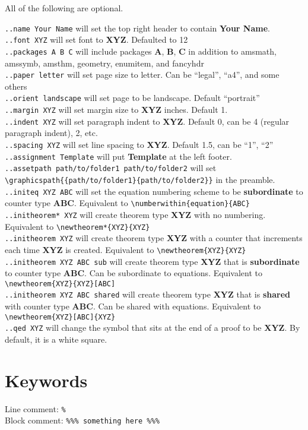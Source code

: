 \documentclass[12pt]{article}
\newcommand{\nl}{\\}
\renewcommand\bold{\textbf}
\numberwithin{equation}{section}
\begin{document}
\begin{flushleft}
\bigskip
\bigskip

All of the following are optional.

\verb|..name Your Name| will set the top right header to contain \bold{Your Name}. \nl
\verb|..font XYZ| will set font to \bold{XYZ}. Defaulted to 12 \nl
\verb|..packages A B C| will include packages \bold{A}, \bold{B}, \bold{C} in addition to amsmath, amssymb, amsthm, geometry, enumitem, and fancyhdr \nl
\verb|..paper letter| will set page size to letter. Can be ``legal'', ``a4'', and some others\nl
\verb|..orient landscape| will set page to be landscape. Default ``portrait''\nl
\bigskip
\verb|..margin XYZ| will set margin size to \bold{XYZ} inches. Default 1.\nl
\verb|..indent XYZ| will set paragraph indent to \bold{XYZ}. Default 0, can be 4 (regular paragraph indent), 2, etc. \nl
\verb|..spacing XYZ| will set line spacing to \bold{XYZ}. Default 1.5, can be ``1'', ``2''\nl
\verb|..assignment Template| will put \bold{Template} at the left footer. \nl
\verb|..assetpath path/to/folder1 path/to/folder2| will set \verb|\graphicspath{{path/to/folder1}{path/to/folder2}}| in the preamble. \nl
\bigskip
\verb|..initeq XYZ ABC| will set the equation numbering scheme to be \bold{subordinate} to counter type \bold{ABC}. Equivalent to \verb|\numberwithin{equation}{ABC}|\nl
\verb|..initheorem* XYZ| will create theorem type \bold{XYZ} with no numbering. Equivalent to \verb|\newtheorem*{XYZ}{XYZ}|\nl
\verb|..initheorem XYZ| will create theorem type \bold{XYZ} with a counter that increments each time \bold{XYZ} is created. Equivalent to \verb|\newtheorem{XYZ}{XYZ}|\nl
\verb|..initheorem XYZ ABC sub| will create theorem type \bold{XYZ} that is \bold{subordinate} to counter type \bold{ABC}. Can be subordinate to equations. Equivalent to \verb|\newtheorem{XYZ}{XYZ}[ABC]|\nl
\verb|..initheorem XYZ ABC shared| will create theorem type \bold{XYZ} that is \bold{shared} with counter type \bold{ABC}. Can be shared with equations. Equivalent to \verb|\newtheorem{XYZ}[ABC]{XYZ}|\nl
\verb|..qed XYZ| will change the symbol that sits at the end of a proof to be \bold{XYZ}. By default, it is a white square.

\newpage

\section{Keywords}

Line comment: \verb|%|\nl
Block comment: \verb|%|\verb|%|\verb|%|\verb| something here |\verb|%|\verb|%|\verb|%|


\end{flushleft}
\end{document}
